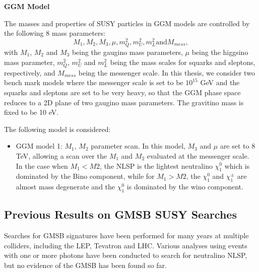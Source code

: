\documentclass[thesis.tex]{subfiles}
\begin{document}
\noindent \textbf{GGM Model}

The masses and properties of SUSY particles in GGM models are controlled by the following 8 mass parameters:
	\begin{equation}
		M_1, M_2, M_3, \mu, m_Q^2, m_U^2, m_L^2 \text{and} M_{mess},
	\end{equation}
with $M_1$, $M_2$ and $M_3$ being the gaugino mass parameters, $\mu$ being the higgsino mass parameter, $m_Q^2$, $m_U^2$ and $m_L^2$ being the mass scales for squarks and sleptons, respectively, and $M_{mess}$ being the messenger scale. 
In this thesis, we consider two bench mark models where the messenger scale is set to be $10^{15}$ GeV and the squarks and sleptons are set to be very heavy, so that the GGM phase space reduces to a 2D plane of two gaugino mass parameters.
The gravitino mass is fixed to be 10 eV.

The following model is considered:
	\begin{itemize}
		\item GGM model 1: $M_1$, $M_2$ parameter scan. In this model, $M_3$ and $\mu$ are set to 8 TeV, allowing a scan over the $M_1$ and $M_2$ evaluated at the messenger scale. In the case when $M_1 < M2$, the NLSP is the lightest neutralino $\chi_1^0$ which is dominated by the Bino component, while for $M_1 > M2$, the $\chi_1^0$ and $\chi_1^\pm$ are almost mass degenerate and the $\chi_1^0$ is dominated by the wino component. 
	\end{itemize}

\subsection{Previous Results on GMSB SUSY Searches}
Searches for GMSB signatures have been performed for many years at multiple colliders, including the LEP, Tevatron and LHC.
Various analyses using events with one or more photons have been conducted to search for neutralino NLSP, but no evidence of the GMSB has been found so far.  
\end{document}
